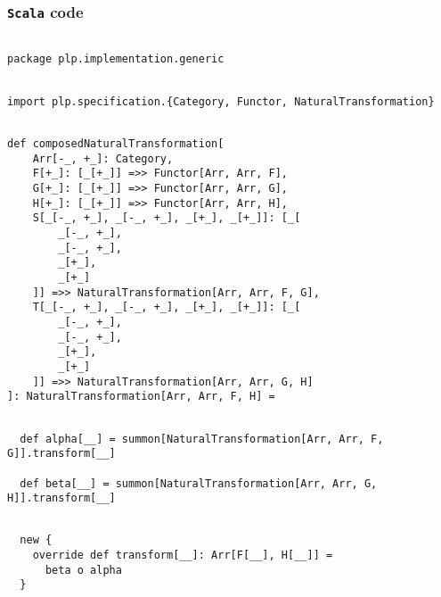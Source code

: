 \documentclass[11pt]{article}
\newcommand{\code}{\subsubsection{{\tt Scala} code}\begingroup\rm \vspace{12pt}}
\def\edefn{\endgroup\par\pagebreak[2]\addvspace{\medskipamount}}
\let\ecode=\edefn
\begin{document}
\code
\begin{mdframed}[backgroundcolor=lightgray!20] 
\begin{lstlisting}

package plp.implementation.generic
\end{lstlisting}
\end{mdframed}
\vspace{6pt}
\begin{mdframed}[backgroundcolor=lightgray!20] 
\begin{lstlisting}

import plp.specification.{Category, Functor, NaturalTransformation}
\end{lstlisting}
\end{mdframed}
\vspace{6pt}
\begin{mdframed}[backgroundcolor=lightgray!20] 
\begin{lstlisting}

def composedNaturalTransformation[
    Arr[-_, +_]: Category,
    F[+_]: [_[+_]] =>> Functor[Arr, Arr, F],
    G[+_]: [_[+_]] =>> Functor[Arr, Arr, G],
    H[+_]: [_[+_]] =>> Functor[Arr, Arr, H],
    S[_[-_, +_], _[-_, +_], _[+_], _[+_]]: [_[
        _[-_, +_],
        _[-_, +_],
        _[+_],
        _[+_]
    ]] =>> NaturalTransformation[Arr, Arr, F, G],
    T[_[-_, +_], _[-_, +_], _[+_], _[+_]]: [_[
        _[-_, +_],
        _[-_, +_],
        _[+_],
        _[+_]
    ]] =>> NaturalTransformation[Arr, Arr, G, H]
]: NaturalTransformation[Arr, Arr, F, H] =
\end{lstlisting}
\end{mdframed}
\vspace{6pt}
\begin{mdframed}[backgroundcolor=lightgray!20] 
\begin{lstlisting}

  def alpha[__] = summon[NaturalTransformation[Arr, Arr, F, G]].transform[__]

  def beta[__] = summon[NaturalTransformation[Arr, Arr, G, H]].transform[__]
\end{lstlisting}
\end{mdframed}
\vspace{6pt}
\begin{mdframed}[backgroundcolor=lightgray!20] 
\begin{lstlisting}

  new {
    override def transform[__]: Arr[F[__], H[__]] =
      beta o alpha
  }
\end{lstlisting}
\end{mdframed}
\ecode
\end{document}
